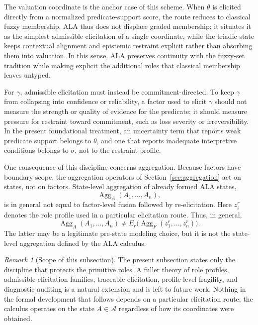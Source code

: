 \documentclass[reqno,final]{amsart}
\theoremstyle{definition}
\theoremstyle{plain}
\theoremstyle{remark}
\newtheorem{remark}{Remark}
\providecommand{\cA}{\mathcal{A}}
\begin{document}
The valuation coordinate is the anchor case of this scheme. When \(\theta\) is elicited directly from a normalized predicate-support score, the route reduces to classical fuzzy membership. ALA thus does not displace graded membership; it situates it as the simplest admissible elicitation of a single coordinate, while the triadic state keeps contextual alignment and epistemic restraint explicit rather than absorbing them into valuation. In this sense, ALA preserves continuity with the fuzzy-set tradition while making explicit the additional roles that classical membership leaves untyped.

For \(\gamma\), admissible elicitation must instead be commitment-directed. To keep \(\gamma\) from collapsing into confidence or reliability, a factor used to elicit \(\gamma\) should not measure the strength or quality of evidence for the predicate; it should measure pressure for restraint toward commitment, such as loss severity or irreversibility. In the present foundational treatment, an uncertainty term that reports weak predicate support belongs to \(\theta\), and one that reports inadequate interpretive conditions belongs to \(\sigma\), not to the restraint profile.

One consequence of this discipline concerns aggregation. Because factors have boundary scope, the aggregation operators of Section~\ref{sec:aggregation} act on states, not on factors. State-level aggregation of already formed ALA states,
\[
\operatorname{Agg}_{A}(A_1,\ldots,A_n),
\]
is in general not equal to factor-level fusion followed by re-elicitation. Here \(z_i^r\) denotes the role profile used in a particular elicitation route. Thus, in general,
\[
\operatorname{Agg}_{A}(A_1,\ldots,A_n)
\neq
E_r\bigl(\operatorname{Agg}_{F}(z_1^r,\ldots,z_n^r)\bigr).
\]
The latter may be a legitimate pre-state modeling choice, but it is not the state-level aggregation defined by the ALA calculus.

\begin{remark}[Scope of this subsection]
\label{rem:elicitation-scope}
The present subsection states only the discipline that protects the primitive roles. A fuller theory of role profiles, admissible elicitation families, traceable elicitation, profile-level fragility, and diagnostic auditing is a natural extension and is left to future work. Nothing in the formal development that follows depends on a particular elicitation route; the calculus operates on the state \(A\in\cA\) regardless of how its coordinates were obtained.
\end{remark}
\end{document}
